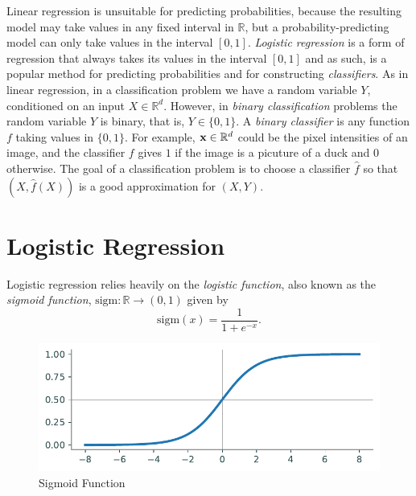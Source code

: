 \newcommand{\bbeta}{\boldsymbol\beta}
\newcommand{\trans}{^\mathsf{T}}
\newcommand{\softmax}{\mathscr{S}}      %
\newcommand{\cat}{\text{Cat}}
\newcommand{\logistic}{\text{sigm}}


Linear regression is unsuitable for predicting probabilities, because the resulting model may take values in any fixed interval in $\mathbb{R}$, but a probability-predicting model can only take values in the interval $[0,1]$.
\emph{Logistic regression} is a form of regression that always takes its values in the interval $[0,1]$ and as such, is a popular method for predicting probabilities and for constructing \emph{classifiers}.
As in linear regression, in a classification problem we have a random variable $Y$, conditioned on an input $X \in \mathbb{R}^d$. 
However, in \emph{binary classification} problems the random variable $Y$ is binary, that is, $Y\in\{0,1\}$.   
A \emph{binary classifier} is any function $f$ taking values in $\{0,1\}$. 
For example, $\mathbf{x}\in \mathbb{R}^d$ could be the pixel intensities of an image, and the classifier $f$ gives $1$ if the image is a picuture of a duck and $0$ otherwise.  
The goal of a classification problem is to choose a classifier $\widehat{f}$ so that $(X,\widehat{f}(X))$ is a good approximation for $(X,Y)$.

\section*{Logistic Regression}
Logistic regression relies heavily on the \emph{logistic function}, also known as the \emph{sigmoid function}, $\text{sigm} : \mathbb{R} \rightarrow (0,1)$ given by
\begin{equation}\label{eq:logistic}
\text{sigm}(x) = \frac{1}{1 + e^{-x}}.
\end{equation}

\begin{figure}[H]
    \includegraphics[width=.7\textwidth]{figures/sigmoid.pdf}
    \caption{Sigmoid Function}
\end{figure}

